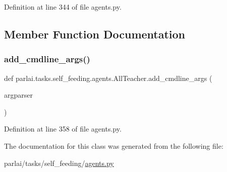Definition at line 344 of file agents.\+py.



\subsection{Member Function Documentation}
\mbox{\label{classparlai_1_1tasks_1_1self__feeding_1_1agents_1_1AllTeacher_aaf96c800f6f56fac5b3c014bb193caa7}} 
\subsubsection{\texorpdfstring{add\+\_\+cmdline\+\_\+args()}{add\_cmdline\_args()}}
{\footnotesize\ttfamily def parlai.\+tasks.\+self\+\_\+feeding.\+agents.\+All\+Teacher.\+add\+\_\+cmdline\+\_\+args (\begin{DoxyParamCaption}\item[{}]{argparser }\end{DoxyParamCaption})\hspace{0.3cm}{\ttfamily [static]}}



Definition at line 358 of file agents.\+py.



The documentation for this class was generated from the following file\+:\begin{DoxyCompactItemize}
\item 
parlai/tasks/self\+\_\+feeding/\hyperlink{parlai_2tasks_2self__feeding_2agents_8py}{agents.\+py}\end{DoxyCompactItemize}
